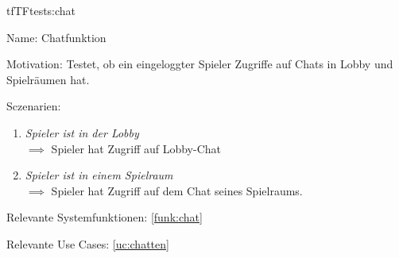 \begin{description}[leftmargin=5em, style=sameline]
\begin{lhp}{tf}{TF}{tests:chat}
	\item [Name:] Chatfunktion
	\item [Motivation:] Testet, ob ein eingeloggter Spieler Zugriffe auf Chats in Lobby und Spielräumen hat.
	\item [Sczenarien:] \hfill
		\begin{enumerate}
			\item \textit{Spieler ist in der Lobby} \\ $\implies$ Spieler hat Zugriff auf Lobby-Chat  
			\item \textit{Spieler ist in einem Spielraum} \\ $\implies$ Spieler hat Zugriff auf dem Chat seines Spielraums.
		\end{enumerate}
	\item [Relevante Systemfunktionen:] \ref{funk:chat}
	\item [Relevante Use Cases:] \ref{uc:chatten}
\end{lhp}

\end{description}